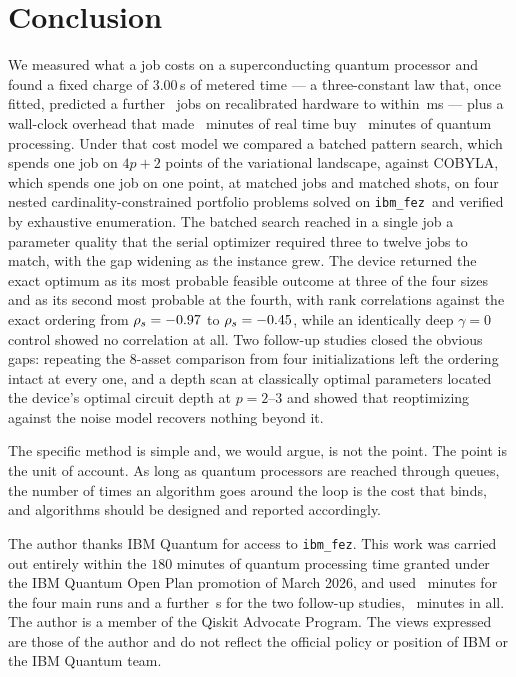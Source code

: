 \documentclass[aps,prx,preprint,superscriptaddress,nofootinbib,longbibliography]{revtex4-2}
\newcommand{\ibmfez}{\texttt{ibm\_fez}}
\begin{document}
\section{Conclusion}

We measured what a job costs on a superconducting quantum processor and found a fixed charge of
$3.00\,$s of metered time --- a three-constant law that, once fitted, predicted a further
\oosjobs\ jobs on recalibrated hardware to within \oosres\,ms --- plus a wall-clock overhead that
made \allwallmin\ minutes of real time buy \allqpumin\ minutes of quantum processing. Under that cost model we compared a
batched pattern search, which spends one job on $4p+2$ points of the variational landscape,
against COBYLA, which spends one job on one point, at matched jobs and matched shots, on four
nested cardinality-constrained portfolio problems solved on \ibmfez\ and verified by
exhaustive enumeration. The batched search reached in a single job a parameter quality that
the serial optimizer required three to twelve jobs to match, with the gap widening as the
instance grew. The device returned the exact optimum as its most probable feasible outcome at
three of the four sizes and as its second most probable at the fourth, with rank correlations
against the exact ordering from $\rho_s = -0.97$ to $\rho_s = -0.45$, while an
identically deep $\gamma=0$ control showed no correlation at all. Two follow-up studies closed
the obvious gaps: repeating the $8$-asset comparison from four initializations left the ordering
intact at every one, and a depth scan at classically optimal parameters located the device's
optimal circuit depth at $p = 2$--$3$ and showed that reoptimizing against the noise model
recovers nothing beyond it.

The specific method is simple and, we would argue, is not the point. The point is the unit of
account. As long as quantum processors are reached through queues, the number of times an
algorithm goes around the loop is the cost that binds, and algorithms should be designed and
reported accordingly.

\begin{acknowledgments}
The author thanks IBM Quantum for access to \ibmfez. This work was carried out entirely within
the $180$ minutes of quantum processing time granted under the IBM Quantum Open Plan promotion
of March 2026, and used \totqpumin\ minutes for the four main runs and a further \oosqpu\,s for the two
follow-up studies, \allqpumin\ minutes in all. The author is a member of the Qiskit Advocate
Program. The views expressed are those of the author and do not reflect the official policy or
position of IBM or the IBM Quantum team.
\end{acknowledgments}
\end{document}
